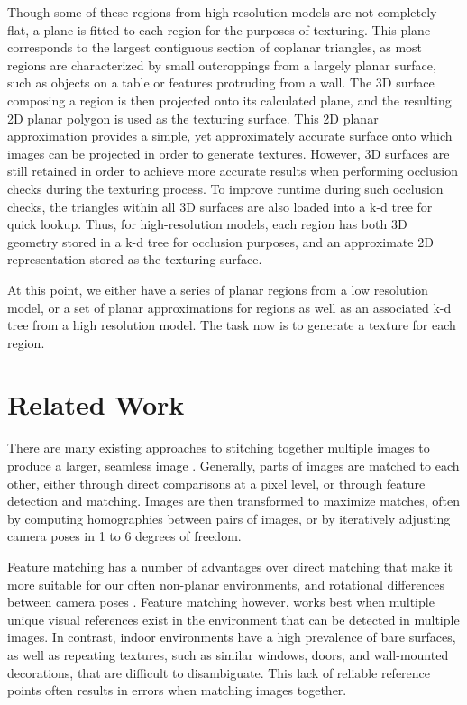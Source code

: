 \documentclass[]{spie}  %
\begin{document}
Though some of these regions from high-resolution models are not
completely flat, a plane is fitted to each region for the purposes of
texturing. This plane corresponds to the largest contiguous section of
coplanar triangles, as most regions are characterized by small
outcroppings from a largely planar surface, such as objects on a table
or features protruding from a wall. The 3D surface composing a region
is then projected onto its calculated plane, and the resulting 2D
planar polygon is used as the texturing surface. This 2D planar
approximation provides a simple, yet approximately accurate surface
onto which images can be projected in order to generate
textures. However, 3D surfaces are still retained in order to achieve
more accurate results when performing occlusion checks during the
texturing process. To improve runtime during such occlusion checks,
the triangles within all 3D surfaces are also loaded into a k-d tree
for quick lookup. Thus, for high-resolution models, each region has
both 3D geometry stored in a k-d tree for occlusion purposes, and an
approximate 2D representation stored as the texturing surface.

At this point, we either have a series of planar regions from a low
resolution model, or a set of planar approximations for regions as
well as an associated k-d tree from a high resolution model. The task
now is to generate a texture for each region.

\section{Related Work}
\label{sec:relatedWork}
There are many existing approaches to stitching together multiple
images to produce a larger, seamless image \cite{szeliski2006image,
  agarwalapanoramas, wangmultipleviews, coorg1997matching,
  debevechybrid, bernardinimultiplescans}. Generally, parts of images
are matched to each other, either through direct comparisons at a
pixel level, or through feature detection and matching. Images are
then transformed to maximize matches, often by computing homographies
between pairs of images, or by iteratively adjusting camera poses in 1
to 6 degrees of freedom.

Feature matching has a number of advantages over direct matching that
make it more suitable for our often non-planar environments, and
rotational differences between camera poses
\cite{szeliski2006image}. Feature matching however, works best when
multiple unique visual references exist in the environment that can be
detected in multiple images. In contrast, indoor environments have a
high prevalence of bare surfaces, as well as repeating textures, such
as similar windows, doors, and wall-mounted decorations, that are
difficult to disambiguate. This lack of reliable reference points
often results in errors when matching images together.
\end{document}

